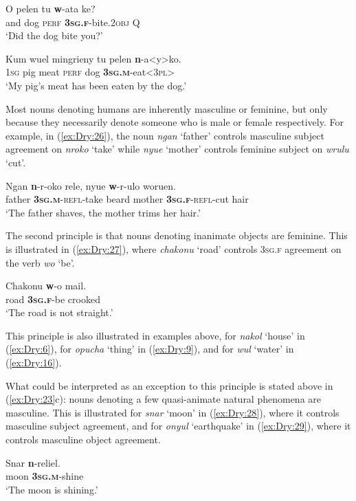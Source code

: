 \documentclass[output=collectionpaper]{langsci/langscibook}
\begin{document}
\ea \label{ex:Dry:24}
\gll O	pelen	tu	\textbf{w}-ata	ke?\\
and dog \textsc{perf} \textbf{\textsc{3sg.f}}-bite.\textsc{2obj} Q\\
\glt `Did the dog bite you?'
\z

\ea \label{ex:Dry:25}
\gll Kum	wuel	mingrieny	tu	pelen	\textbf{n}-a<y>ko.\\
\textsc{1sg} pig meat \textsc{perf} dog \textbf{\textsc{3sg.m}}-eat<\textsc{3pl}>\\
\glt `My pig's meat has been eaten by the dog.'
\z

Most nouns denoting humans are inherently masculine or feminine, but only because they necessarily denote someone who is male or female respectively. For example, in (\ref{ex:Dry:26}), the noun \textit{ngan} `father' controls masculine subject agreement on \textit{nroko} `take' while \textit{nyue} `mother' controls feminine subject on \textit{wrulu} `cut'.

\ea \label{ex:Dry:26}
\gll Ngan	\textbf{n}-r-oko	rele,	nyue	\textbf{w}-r-ulo woruen.\\
father \textbf{\textsc{3sg.m}}-\textsc{refl}-take beard mother \textbf{\textsc{3sg.f}}-\textsc{refl}-cut hair\\
\glt `The father shaves, the mother trims her hair.'
\z

The second principle is that nouns denoting inanimate objects are feminine. This is illustrated in (\ref{ex:Dry:27}), where \textit{chakonu} `road' controls \textsc{3sg.f} agreement on the verb \textit{wo} `be'.

\ea \label{ex:Dry:27}
\gll Chakonu	\textbf{w}-o	mail.\\
road \textbf{\textsc{3sg.f}}-be crooked\\
\glt `The road is not straight.'
\z

This principle is also illustrated in examples above, for \textit{nakol} `house' in (\ref{ex:Dry:6}), for \textit{opucha} `thing' in (\ref{ex:Dry:9}), and for \textit{wul} `water' in (\ref{ex:Dry:16}).

What could be interpreted as an exception to this principle is stated above in (\ref{ex:Dry:23}c): nouns denoting a few quasi-animate natural phenomena are masculine. This is illustrated for \textit{snar} `moon' in (\ref{ex:Dry:28}), where it controls masculine subject agreement, and for \textit{onyul} `earthquake' in (\ref{ex:Dry:29}), where it controls masculine object agreement.

\ea \label{ex:Dry:28}
\gll Snar	\textbf{n}-reliel.\\
moon \textbf{\textsc{3sg.m}}-shine\\
\glt `The moon is shining.'
\z
\end{document}
